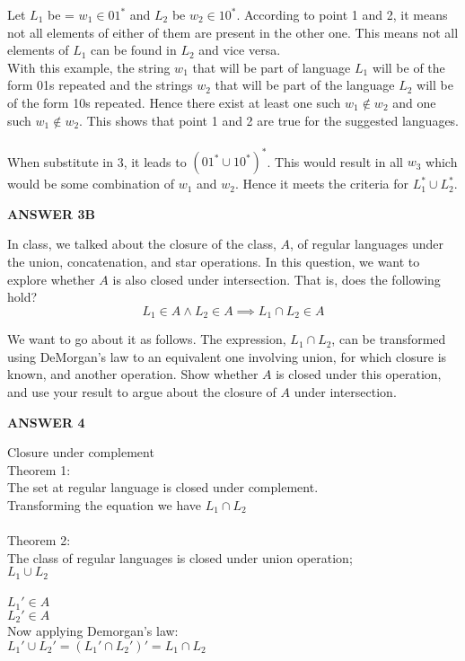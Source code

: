 \documentclass[addpoints]{exam}
\begin{document}
\begin{questions}
  Let $L_{1}$ be = ${w_{1} \in {01}^*}$ and $L_{2}$ be ${w_{2} \in {10}^*}$. According to point 1 and 2, it means not all elements of either of them are present in the other one. This means not all elements of $L_{1}$ can be found in $L_{2}$ and vice versa. \\
  
  With this example, the string $w_{1}$ that will be part of language $L_{1}$ will be of the form 01s repeated and the strings $w_{2}$ that will be part of the language $L_{2}$ will be of the form 10s repeated. Hence there exist at least one such $w_{1} \not\in w_{2}$ and one such $w_{1} \not\in  w_{2}$. This shows that point 1 and 2 are true for the suggested languages.
  \\ \\
  When substitute in 3, it leads to $({01}^* \cup {10}^*)^*$. This would result in all $w_{3}$ which would be some combination of $w_{1}$ and $w_{2}$. Hence it meets the criteria for $L_{1}^* \cup L_{2}^*$.

  \begin{center}
      \textbf{ANSWER 3B}
  \end{center}

  

  

\question[5] In class, we talked about the closure of the class, $A$, of regular languages under the union, concatenation, and star operations. In this question, we want to explore whether $A$ is also closed under intersection. That is, does the following hold?
  \[
    L_1\in A \land L_2\in A \implies L_1 \cap L_2\in A
  \]

  We want to go about it as follows. The expression, $L_1 \cap L_2$, can be transformed using DeMorgan's law to an equivalent one involving union, for which closure is known, and another operation. Show whether $A$ is closed under this operation, and use your result to argue about the closure of $A$ under intersection.
   \begin{center}
      \textbf{ANSWER 4 }
  \end{center} 
  Closure under complement \\ 
  Theorem 1:\\
  The set at regular language is closed under complement. \\
  Transforming the equation we have $L_{1} \cap L_{2}$ \\ \\
     Theorem 2: \\
     The class of regular languages is closed under union operation; \\
     $L_{1} \cup L_{2}$ \\ \\
     $L_{1}' \in A$\\
     $L_{2}' \in A$ \\
    Now applying Demorgan's law: \\
    $L_{1}' \cup L_{2}' = (L_{1}' \cap L_{2}')' = L_{1} \cap L_{2} $
  \\


\end{questions}
\end{document}
